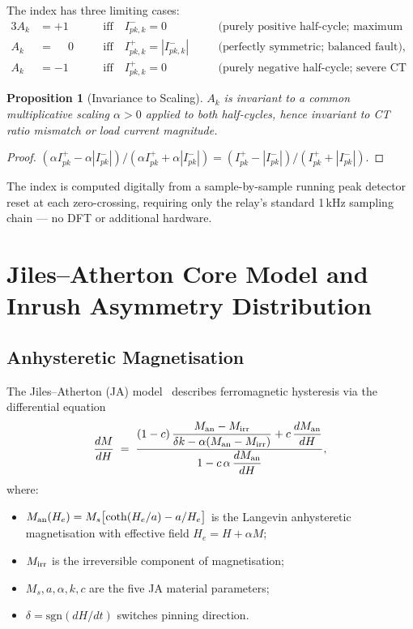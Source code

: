 \documentclass[11pt, a4paper]{article}
\newtheorem{proposition}{Proposition}
\newcommand{\Ak}{A_k}
\begin{document}
The index has three limiting cases:
\begin{alignat}{3}
  \Ak &= +1 \quad&&\text{iff} \quad I^-_{pk,k} = 0 \quad&&\text{(purely positive half-cycle; maximum inrush),}\\
  \Ak &= \phantom{+}0 \quad&&\text{iff} \quad I^+_{pk,k} = |I^-_{pk,k}| \quad&&\text{(perfectly symmetric; balanced fault),}\\
  \Ak &= -1 \quad&&\text{iff} \quad I^+_{pk,k} = 0 \quad&&\text{(purely negative half-cycle; severe CT saturation).}
\end{alignat}

\begin{proposition}[Invariance to Scaling]
$\Ak$ is invariant to a common multiplicative scaling $\alpha > 0$ applied to
both half-cycles, hence invariant to CT ratio mismatch or load current
magnitude.
\end{proposition}
\begin{proof}
  $(\alpha I^+_{pk} - \alpha|I^-_{pk}|)/(\alpha I^+_{pk} + \alpha|I^-_{pk}|)
  = (I^+_{pk} - |I^-_{pk}|)/(I^+_{pk} + |I^-_{pk}|)$.
\end{proof}

The index is computed digitally from a sample-by-sample running peak detector
reset at each zero-crossing, requiring only the relay's standard 1\,kHz
sampling chain — no DFT or additional hardware.

\section{Jiles--Atherton Core Model and Inrush Asymmetry Distribution}
\label{sec:jiles_atherton}

\subsection{Anhysteretic Magnetisation}

The Jiles--Atherton (JA) model~\cite{Jiles1986} describes ferromagnetic
hysteresis via the differential equation
\begin{equation}
  \frac{dM}{dH} \;=\;
  \frac{(1-c)\,\dfrac{M_{\rm an} - M_{\rm irr}}{\delta k - \alpha(M_{\rm an}-M_{\rm irr})}
        + c\,\dfrac{dM_{\rm an}}{dH}}
       {1 - c\,\alpha\,\dfrac{dM_{\rm an}}{dH}},
  \label{eq:JA}
\end{equation}
where:
\begin{itemize}
  \item $M_{\rm an}(H_e) = M_s\bigl[\coth(H_e/a) - a/H_e\bigr]$
    is the Langevin anhysteretic magnetisation with effective field
    $H_e = H + \alpha M$;
  \item $M_{\rm irr}$ is the irreversible component of magnetisation;
  \item $M_s, a, \alpha, k, c$ are the five JA material parameters;
  \item $\delta = \text{sgn}(dH/dt)$ switches pinning direction.
\end{itemize}
\end{document}
